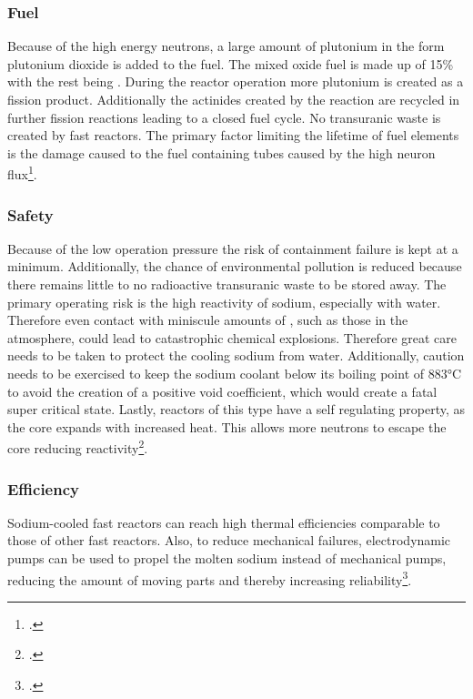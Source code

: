 \subsubsection{Fuel}
Because of the high energy neutrons, a large amount of plutonium in the form
plutonium dioxide  is added to the fuel. The mixed oxide fuel is made up of 15\% 
with the rest being . During the reactor operation more plutonium is created as a fission product.
Additionally the actinides created by the reaction are recycled in further fission reactions leading
to a closed fuel cycle. No transuranic waste is created by fast reactors. The primary
factor limiting the lifetime of fuel elements is the damage caused to the fuel containing tubes
caused by the high neuron flux\footcite[111]{T4Gen}.
\subsubsection{Safety}
Because of the low operation pressure the risk of containment failure is kept at a minimum. Additionally,
the chance of environmental pollution is reduced because there remains little to no radioactive transuranic
waste to be stored away. The primary operating risk is the high reactivity of sodium, especially with water.
Therefore even contact with miniscule amounts of , such as those in the atmosphere, could
lead to catastrophic chemical explosions. Therefore great care needs to be taken to protect the cooling
sodium from water. Additionally, caution needs to be exercised to keep the sodium coolant
below its boiling point of 883°C to avoid the creation of a positive void coefficient, which
would create a fatal super critical state. Lastly, reactors of this type have a self regulating
property, as the core expands with increased heat. This allows more neutrons to escape the
core reducing reactivity\footcite[30-37]{GIFAR}.
\subsubsection{Efficiency}
Sodium-cooled fast reactors can reach high thermal efficiencies comparable to those of other fast
reactors. Also, to reduce mechanical failures, electrodynamic pumps can be used to propel the
molten sodium instead of mechanical pumps, reducing the amount of moving parts and thereby increasing
reliability\footcite[30-37]{GIFAR}. 
\pagebreak
